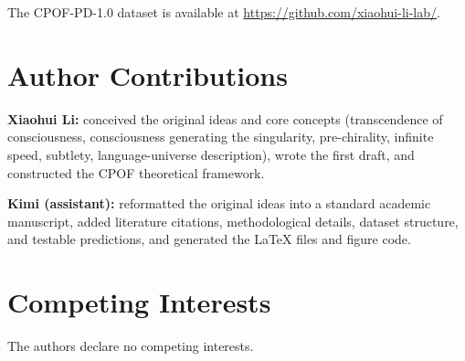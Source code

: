 \documentclass[11pt,a4paper]{article}
\begin{document}
The CPOF-PD-1.0 dataset is available at \url{https://github.com/xiaohui-li-lab/}.

\section*{Author Contributions}

\textbf{Xiaohui Li:} conceived the original ideas and core concepts (transcendence of consciousness, consciousness generating the singularity, pre-chirality, infinite speed, subtlety, language-universe description), wrote the first draft, and constructed the CPOF theoretical framework.

\textbf{Kimi (assistant):} reformatted the original ideas into a standard academic manuscript, added literature citations, methodological details, dataset structure, and testable predictions, and generated the LaTeX files and figure code.

\section*{Competing Interests}

The authors declare no competing interests.
\end{document}
